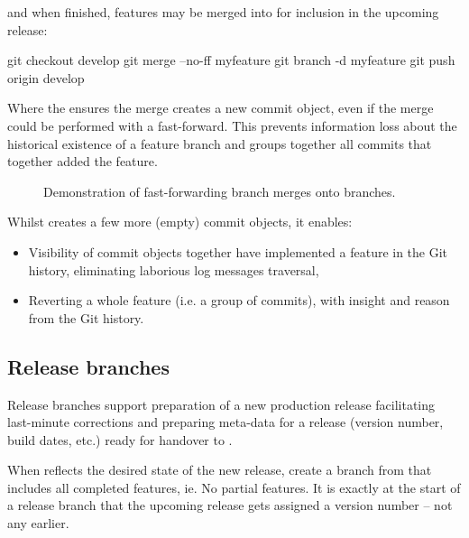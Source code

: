 \noindent and when finished, features may be merged into  for inclusion in the upcoming release:

\begin{git-bash}
    git checkout develop
    git merge --no-ff myfeature
    git branch -d myfeature
    git push origin develop
\end{git-bash}

Where the  ensures the merge creates a new commit object, even if the merge could be performed with a fast-forward. This prevents information loss about the historical existence of a feature branch and groups together all commits that together added the feature.

\vspace{12\baselineskip}%
\begin{figure}[H]
	\centering
	\noindent\resizebox{.66\textwidth}{!}{}
	\caption[Main branches]{Demonstration of fast-forwarding  branch merges onto  branches.}
\end{figure}

\noindent Whilst  creates a few more (empty) commit objects, it enables:

\begin{itemize}
	\item Visibility of commit objects together have implemented a feature in the Git history, eliminating laborious log messages traversal,
	\item Reverting a whole feature (i.e. a group of commits), with insight and reason from the Git history.
\end{itemize}



\subsection{Release branches}

Release branches support preparation of a new production release facilitating last-minute corrections and preparing meta-data for a release (version number, build dates, etc.) ready for handover to .

When  reflects the desired state of the new release, create a  branch from  that includes all completed features, ie. No partial features. It is exactly at the start of a release branch that the upcoming release gets assigned a version number -- not any earlier. 


